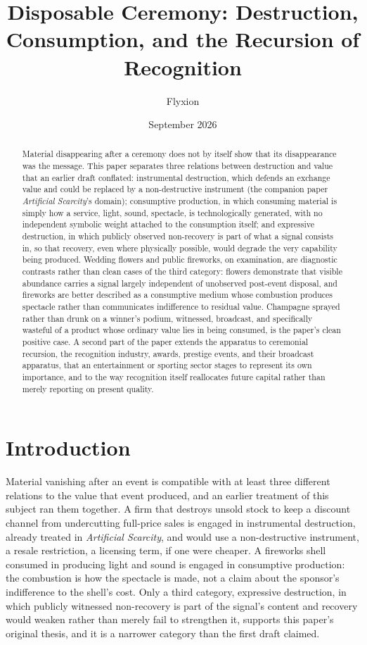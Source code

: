 \documentclass[11pt]{article}
\title{Disposable Ceremony: Destruction, Consumption, and the Recursion of Recognition}
\author{Flyxion}
\affil{Independent Researcher}
\date{September 2026}
\begin{document}
\maketitle

\begin{abstract}
Material disappearing after a ceremony does not by itself show that its disappearance was the message. This paper separates three relations between destruction and value that an earlier draft conflated: instrumental destruction, which defends an exchange value and could be replaced by a non-destructive instrument (the companion paper \emph{Artificial Scarcity}'s domain); consumptive production, in which consuming material is simply how a service, light, sound, spectacle, is technologically generated, with no independent symbolic weight attached to the consumption itself; and expressive destruction, in which publicly observed non-recovery is part of what a signal consists in, so that recovery, even where physically possible, would degrade the very capability being produced. Wedding flowers and public fireworks, on examination, are diagnostic contrasts rather than clean cases of the third category: flowers demonstrate that visible abundance carries a signal largely independent of unobserved post-event disposal, and fireworks are better described as a consumptive medium whose combustion produces spectacle rather than communicates indifference to residual value. Champagne sprayed rather than drunk on a winner's podium, witnessed, broadcast, and specifically wasteful of a product whose ordinary value lies in being consumed, is the paper's clean positive case. A second part of the paper extends the apparatus to ceremonial recursion, the recognition industry, awards, prestige events, and their broadcast apparatus, that an entertainment or sporting sector stages to represent its own importance, and to the way recognition itself reallocates future capital rather than merely reporting on present quality.
\end{abstract}

\section{Introduction}

Material vanishing after an event is compatible with at least three different relations to the value that event produced, and an earlier treatment of this subject ran them together. A firm that destroys unsold stock to keep a discount channel from undercutting full-price sales is engaged in instrumental destruction, already treated in \emph{Artificial Scarcity}, and would use a non-destructive instrument, a resale restriction, a licensing term, if one were cheaper. A fireworks shell consumed in producing light and sound is engaged in consumptive production: the combustion is how the spectacle is made, not a claim about the sponsor's indifference to the shell's cost. Only a third category, expressive destruction, in which publicly witnessed non-recovery is part of the signal's content and recovery would weaken rather than merely fail to strengthen it, supports this paper's original thesis, and it is a narrower category than the first draft claimed.
\end{document}
